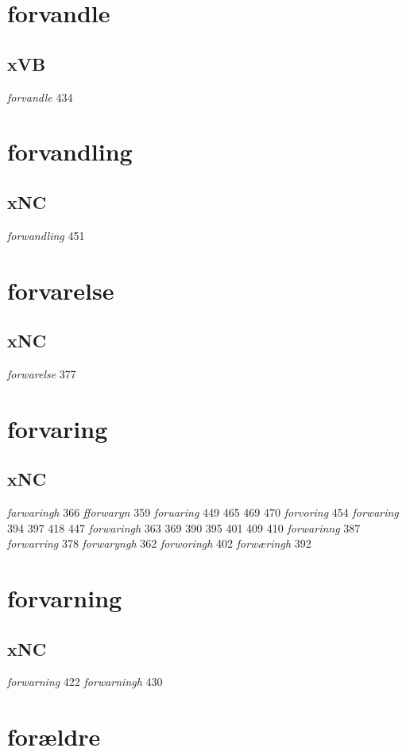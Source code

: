\documentclass[a4paper,twocolumn]{article}
\begin{document}
\section{forvandle}
\label{sec:org6eb42c3}
\subsection{xVB}
\label{sec:org58bb275}
\emph{forvandle} 434 
\section{forvandling}
\label{sec:orga65663f}
\subsection{xNC}
\label{sec:orgbe05059}
\emph{forwandling} 451 
\section{forvarelse}
\label{sec:org22516e7}
\subsection{xNC}
\label{sec:org033a04a}
\emph{forwarelse} 377 
\section{forvaring}
\label{sec:orgf923bed}
\subsection{xNC}
\label{sec:orgd4db7ec}
\emph{farwaringh} 366 \emph{fforwaryn} 359 \emph{foruaring} 449 465 469 470 \emph{forvoring} 454 \emph{forwaring} 394 397 418 447 \emph{forwaringh} 363 369 390 395 401 409 410 \emph{forwarinng} 387 \emph{forwarring} 378 \emph{forwaryngh} 362 \emph{forworingh} 402 \emph{forwæringh} 392 
\section{forvarning}
\label{sec:org0d32857}
\subsection{xNC}
\label{sec:orge85a8f9}
\emph{forwarning} 422 \emph{forwarningh} 430 
\section{forældre}
\label{sec:orga8b9d5b}
\end{document}
